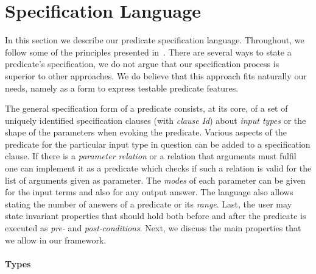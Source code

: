 
\section{Specification Language}
\label{sec:pred-spec}

In this section we describe our predicate specification language.
%
Throughout, we follow some of the principles presented
in~\cite{Deville1990logprog}.
%
There are several ways to state a predicate's specification, we do not
argue that our specification process is superior to other approaches.
%
We do believe that this approach fits naturally our needs, namely as a
form to express testable predicate features. %


The general specification form of a predicate  consists, at its
core, of a set of uniquely identified specification clauses
 (with \emph{clause Id})
 about \emph{input types} or the shape of the parameters when evoking the predicate.
%
%
Various aspects of the predicate for the particular input type in
question can be added to a specification clause.
%
If there is
a \emph{parameter relation} or
 a relation that arguments must fulfil one can implement it
as a predicate%
which checks if such a relation is
valid for the list of arguments given as parameter.
%
The \emph{modes} of each parameter can be given for the input terms and also
for any output answer.
%
The language also allows stating the number of
answers of a predicate
or its \emph{range}.
%
Last, the user may state invariant properties that should hold both
before and after the predicate is executed as \emph{pre-} and \emph{post-conditions}.
%
Next, we discuss the main properties that we allow in our framework.

\paragraph{\bf Types}


